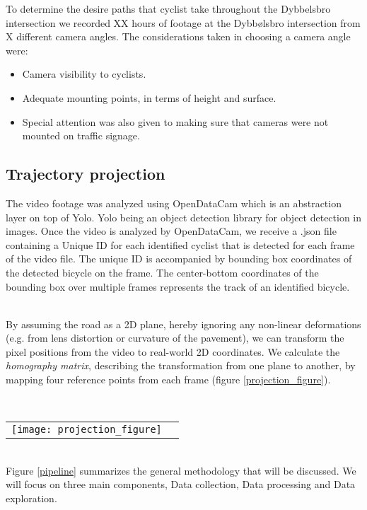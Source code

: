 To determine the desire paths that cyclist take throughout the Dybbelsbro intersection we recorded XX hours of footage 
at the Dybbølsbro intersection from X different camera angles.
The considerations taken in choosing a camera angle were:

\begin{itemize}
	\item Camera visibility to cyclists.
	\item Adequate mounting points, in terms of height and surface.
	\item Special attention was also given to making sure that cameras were not mounted on traffic signage.
\end{itemize}

\subsection{Trajectory projection}
The video footage was analyzed using OpenDataCam which is an abstraction layer on top of Yolo. Yolo being an object detection library for object detection in images.
Once the video is analyzed by OpenDataCam, we receive a .json file containing a Unique ID for each identified cyclist that is detected for each frame of the video file. 
The unique ID is accompanied by bounding box coordinates of the detected bicycle on the frame. 
The center-bottom coordinates of the bounding box over multiple frames represents the track of an identified bicycle.

\ \\
By assuming the road as a 2D plane, hereby ignoring any non-linear deformations (e.g. from lens distortion or curvature of the pavement), 
we can transform the pixel positions from the video to real-world 2D coordinates. 
We calculate the \textit{homography matrix}, describing the transformation from one plane to another, by mapping four reference points from each frame (figure \ref{projection_figure}).

\raggedbottom
\ \\ 
\noindent
\begin{tabular}{@{}cc}
\texttt{[image: projection\_figure]} 
\end{tabular}
\label{projection_figure}

\ \\
Figure \ref{pipeline} summarizes the general methodology that will be discussed. We will focus
on three main components, Data collection, Data processing and Data exploration.

